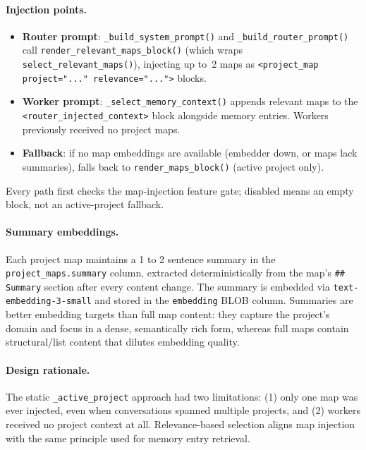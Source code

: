 \documentclass[11pt,letterpaper]{report}
\newcommand{\code}[1]{\texttt{#1}}
\begin{document}
\paragraph{Injection points.}
\begin{itemize}[nosep]
  \item \textbf{Router prompt}: \code{\_build\_system\_prompt()} and
        \code{\_build\_router\_prompt()} call
        \code{render\_relevant\_maps\_block()} (which wraps
        \code{select\_relevant\_maps()}), injecting up to~2 maps as
        \code{<project\_map project="..." relevance="...">} blocks.
  \item \textbf{Worker prompt}: \code{\_select\_memory\_context()}
        appends relevant maps to the
        \code{<router\_injected\_context>} block alongside memory
        entries. Workers previously received no project maps.
  \item \textbf{Fallback}: if no map embeddings are available (embedder
        down, or maps lack summaries), falls back to
        \code{render\_maps\_block()} (active project only).
\end{itemize}
Every path first checks the map-injection feature gate; disabled means an
empty block, not an active-project fallback.

\paragraph{Summary embeddings.}
Each project map maintains a 1 to 2 sentence summary in the
\code{project\_maps.summary} column, extracted deterministically from
the map's \code{\#\# Summary} section after every content change.
The summary is embedded via \code{text-embedding-3-small} and stored in
the \code{embedding} BLOB column.
Summaries are better embedding targets than full map content: they
capture the project's domain and focus in a dense, semantically rich
form, whereas full maps contain structural/list content that dilutes
embedding quality.

\paragraph{Design rationale.}
The static \code{\_active\_project} approach had two limitations:
(1) only one map was ever injected, even when conversations spanned
multiple projects, and (2) workers received no project context at all.
Relevance-based selection aligns map injection with the same principle
used for memory entry retrieval.
\end{document}

